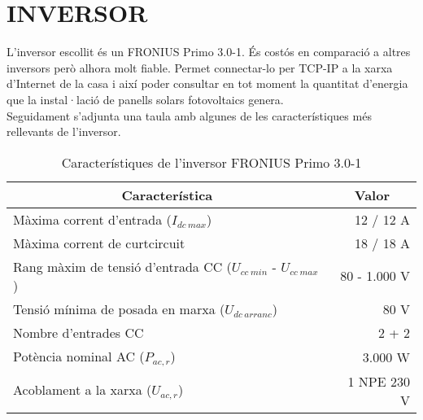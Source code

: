 \chapter{\uppercase{Inversor}}

L'inversor escollit és un FRONIUS Primo 3.0-1. És costós en comparació a altres inversors però alhora molt fiable. Permet connectar-lo per TCP-IP a la xarxa d'Internet de la casa i així poder consultar en tot moment la quantitat d'energia que la instal·lació de panells solars fotovoltaics genera.\\
Seguidament s'adjunta una taula amb algunes de les característiques més rellevants de l'inversor.
\begin{table}[H]
  \centering
    \begin{tabular} {|l|r|} \hline
  \multicolumn{1}{|c|}{Característica} &  \multicolumn{1}{c|}{Valor}\\ \hline \hline
	Màxima corrent d'entrada ($I_{dc \ max}$) & 12 / 12 A \\ \hline
	Màxima corrent de curtcircuit & 18 / 18 A \\ \hline
	Rang màxim de tensió d'entrada CC ($U_{cc \ min}$ - $U_{cc \ max}$) & 80 - 1.000 V \\ \hline
	Tensió mínima de posada en marxa ($U_{dc \ arranc}$) & 80 V \\ \hline
	Nombre d'entrades CC & 2 + 2 \\ \hline
	Potència nominal AC ($P_{ac,r}$) & 3.000 W \\ \hline
	Acoblament a la xarxa ($U_{ac,r}$) & 1 NPE 230 V \\ \hline
	
    \end{tabular}%
  \label{tab:addlabel}%
  \caption{Característiques de l'inversor FRONIUS Primo 3.0-1}
 \end{table}%

